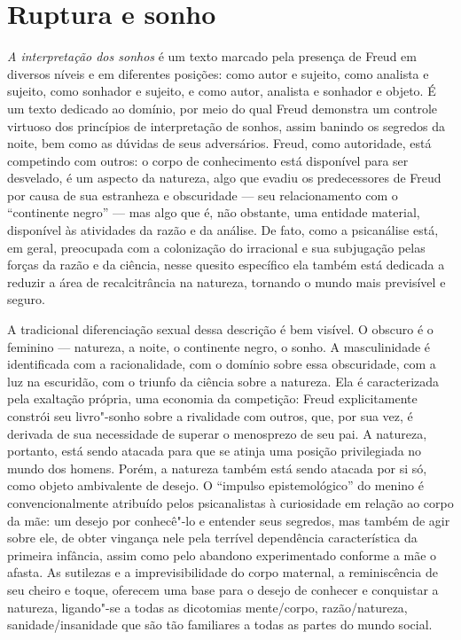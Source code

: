 \section{Ruptura e sonho}

\emph{A interpretação dos sonhos} é um texto marcado pela presença de
Freud em diversos níveis e em diferentes posições: como autor e sujeito,
como analista e sujeito, como sonhador e sujeito, e como autor, analista
e sonhador e objeto. É um texto dedicado ao domínio, por meio do qual
Freud demonstra um controle virtuoso dos princípios de interpretação de
sonhos, assim banindo os segredos da noite, bem como as dúvidas de seus
adversários. Freud, como autoridade, está competindo com outros: o corpo
de conhecimento está disponível para ser desvelado, é um aspecto da
natureza, algo que evadiu os predecessores de Freud por causa de sua
estranheza e obscuridade --- seu relacionamento com o ``continente
negro'' --- mas algo que é, não obstante, uma entidade material,
disponível às atividades da razão e da análise. De fato, como a
psicanálise está, em geral, preocupada com a colonização do irracional e
sua subjugação pelas forças da razão e da ciência, nesse quesito
específico ela também está dedicada a reduzir a área de recalcitrância
na natureza, tornando o mundo mais previsível e seguro.

A tradicional diferenciação sexual dessa descrição é bem visível. O
obscuro é o feminino --- natureza, a noite, o continente negro, o sonho.
A masculinidade é identificada com a racionalidade, com o domínio sobre
essa obscuridade, com a luz na escuridão, com o triunfo da ciência sobre
a natureza. Ela é caracterizada pela exaltação própria, uma economia da
competição: Freud explicitamente constrói seu livro"-sonho sobre a
rivalidade com outros, que, por sua vez, é derivada de sua necessidade
de superar o menosprezo de seu pai. A natureza, portanto, está sendo
atacada para que se atinja uma posição privilegiada no mundo dos homens.
Porém, a natureza também está sendo atacada por si só, como objeto
ambivalente de desejo. O ``impulso epistemológico'' do menino é
convencionalmente atribuído pelos psicanalistas à curiosidade em relação
ao corpo da mãe: um desejo por conhecê"-lo e entender seus segredos, mas
também de agir sobre ele, de obter vingança nele pela terrível
dependência característica da primeira infância, assim como pelo
abandono experimentado conforme a mãe o afasta. As sutilezas e a
imprevisibilidade do corpo maternal, a reminiscência de seu cheiro e
toque, oferecem uma base para o desejo de conhecer e conquistar a
natureza, ligando"-se a todas as dicotomias mente/corpo, razão/natureza,
sanidade/insanidade que são tão familiares a todas as partes do mundo
social.

